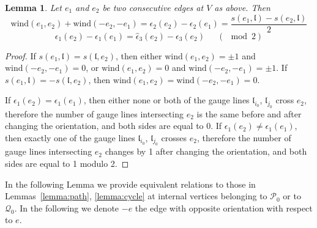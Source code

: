 \documentclass[11pt]{amsart}
\theoremstyle{plain}
\numberwithin{equation}{section}
\newtheorem{lemma}[theorem]{Lemma}
\begin{document}
\begin{lemma}
\label{lem:0.1}
Let $e_1$ and $e_2$ be two consecutive edges at $V$ as above. 
Then 
\begin{equation}
\label{eq:wind12}
\mbox{wind}(e_1,e_2) + \mbox{wind}(-e_2,-e_1) = \epsilon_2(e_2) - \epsilon_2(e_1) =  \frac{s(e_1,\mathfrak{l})-s(e_2,\mathfrak{l}) }{2}
\end{equation}
\begin{equation}
\label{eq:eps12}
\epsilon_1(e_2) - \epsilon_1(e_1) = \hat\epsilon_3(e_2)-\epsilon_3(e_2) \ \  \quad
(\!\!\!\!\!\!\mod 2)
\end{equation}
\end{lemma}
\begin{proof}
If $s(e_1,\mathfrak{l})=s(\mathfrak{l},e_2)$, then either $\mbox{wind}(e_1,e_2)=\pm1$ and $\mbox{wind}(-e_2,-e_1)=0$, or $\mbox{wind}(e_1,e_2)=0$ and $\mbox{wind}(-e_2,-e_1)=\pm1$. 
If $s(e_1,\mathfrak{l})=-s(\mathfrak{l},e_2)$, then $\mbox{wind}(e_1,e_2)=\mbox{wind}(-e_2,-e_1)=0$.

If $\epsilon_1(e_2) = \epsilon_1(e_1)$, then either none or both of the gauge lines $\mathfrak{l}_{i_0}$, $\mathfrak{l}_{j_0}$ cross $e_2$, therefore the number of gauge lines intersecting $e_2$ is the same before and after changing the orientation, and both sides are equal to 0. If $\epsilon_1(e_2) \ne \epsilon_1(e_1)$, then exactly one of the gauge lines $\mathfrak{l}_{i_0}$, $\mathfrak{l}_{j_0}$ crosses $e_2$, therefore the number of gauge lines intersecting $e_2$ changes by 1 after changing the orientation, and both sides are equal to 1 modulo 2. 
\end{proof}


In the following Lemma we provide equivalent relations to those in Lemmas~\ref{lemma:path}, \ref{lemma:cycle} at internal vertices belonging to $\mathcal P_0$ or to $\mathcal Q_0$. 
In the following we denote $-e$ the edge with opposite orientation with respect to $e$. 
\end{document}
